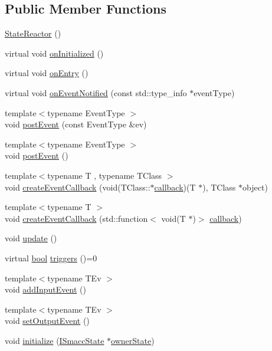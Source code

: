 \subsection*{Public Member Functions}
\begin{DoxyCompactItemize}
\item 
\hyperlink{classsmacc_1_1StateReactor_ae319e9f7b0a2a80b4c5ace6ec8c99fb2}{State\+Reactor} ()
\item 
virtual void \hyperlink{classsmacc_1_1StateReactor_aa10b2c6b7d1e80f01b00cbdac526a2bf}{on\+Initialized} ()
\item 
virtual void \hyperlink{classsmacc_1_1StateReactor_a11ed02721fd751b8272540645b88f4a6}{on\+Entry} ()
\item 
virtual void \hyperlink{classsmacc_1_1StateReactor_a17646b3c68a6d80d1e4da8c14238ce36}{on\+Event\+Notified} (const std\+::type\+\_\+info $\ast$event\+Type)
\item 
{\footnotesize template$<$typename Event\+Type $>$ }\\void \hyperlink{classsmacc_1_1StateReactor_a06303bdf908d04d5a6eb5f63131e68bd}{post\+Event} (const Event\+Type \&ev)
\item 
{\footnotesize template$<$typename Event\+Type $>$ }\\void \hyperlink{classsmacc_1_1StateReactor_a3d149851c5540110a29e9a7b3228239d}{post\+Event} ()
\item 
{\footnotesize template$<$typename T , typename T\+Class $>$ }\\void \hyperlink{classsmacc_1_1StateReactor_a68482e08f6449694a0bcda843b14b376}{create\+Event\+Callback} (void(T\+Class\+::$\ast$\hyperlink{3_2servers_2opencv__perception__node_2opencv__perception__node_8cpp_a050e697bd654facce10ea3f6549669b3}{callback})(T $\ast$), T\+Class $\ast$object)
\item 
{\footnotesize template$<$typename T $>$ }\\void \hyperlink{classsmacc_1_1StateReactor_ac6b3a604009e5a68123aed27e70cf2be}{create\+Event\+Callback} (std\+::function$<$ void(T $\ast$)$>$ \hyperlink{3_2servers_2opencv__perception__node_2opencv__perception__node_8cpp_a050e697bd654facce10ea3f6549669b3}{callback})
\item 
void \hyperlink{classsmacc_1_1StateReactor_aca5d4f7af06532272db55943b7810a43}{update} ()
\item 
virtual \hyperlink{classbool}{bool} \hyperlink{classsmacc_1_1StateReactor_a445bc3c90980d75d7d815b85cfb68b21}{triggers} ()=0
\item 
{\footnotesize template$<$typename T\+Ev $>$ }\\void \hyperlink{classsmacc_1_1StateReactor_acd4b35b4c82241fc27bb858761f6e4de}{add\+Input\+Event} ()
\item 
{\footnotesize template$<$typename T\+Ev $>$ }\\void \hyperlink{classsmacc_1_1StateReactor_ae9d0dd0c8cdcc57f8881f0962040c8ed}{set\+Output\+Event} ()
\item 
void \hyperlink{classsmacc_1_1StateReactor_a5c1d734e3a495fa0f2b01229a3dbac3f}{initialize} (\hyperlink{classsmacc_1_1ISmaccState}{I\+Smacc\+State} $\ast$\hyperlink{classsmacc_1_1StateReactor_aabd30af9412a8fea9ec5906f173d9d4a}{owner\+State})
\end{DoxyCompactItemize}

